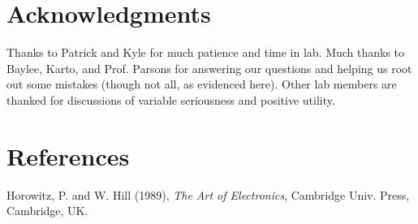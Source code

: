 \documentclass[11pt]{article}
\begin{document}
\section{Acknowledgments}

Thanks to Patrick and Kyle for much patience and time in lab.  Much thanks to
Baylee, Karto, and Prof. Parsons for answering our questions and helping us
root out some mistakes (though not all, as evidenced here).  Other lab members
are thanked for discussions of variable seriousness and positive utility.

\section{References}

\hangindent 0.25in Horowitz, P. and W. Hill (1989), \emph{The Art of
Electronics}, Cambridge Univ. Press, Cambridge, UK.
\end{document}
